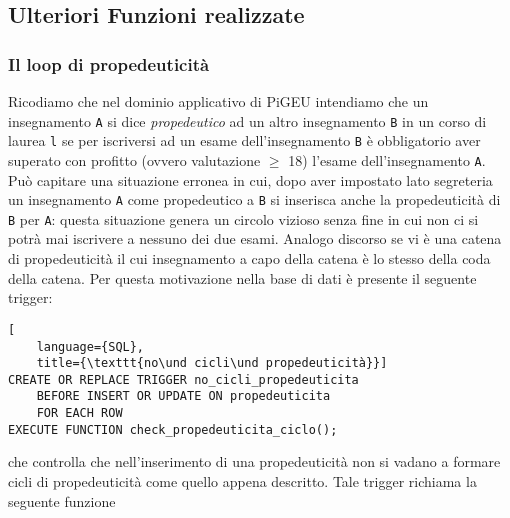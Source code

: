 \documentclass{article}
\newcommand{\und}[0]{\textunderscore}
\begin{document}
\subsection{Ulteriori Funzioni realizzate}
\subsubsection{Il loop di propedeuticità}
Ricodiamo che nel dominio applicativo di PiGEU intendiamo che un insegnamento \texttt{A} si dice \textit{propedeutico} ad un altro insegnamento \texttt{B} in un corso di laurea \texttt{l} se per iscriversi ad un esame dell'insegnamento \texttt{B} è obbligatorio aver superato con profitto (ovvero valutazione $\geq$ 18) l'esame dell'insegnamento \texttt{A}.
Può capitare una situazione erronea in cui, dopo aver impostato lato segreteria un insegnamento \texttt{A} come propedeutico a \texttt{B} si inserisca anche la propedeuticità di \texttt{B} per \texttt{A}: questa situazione genera un circolo vizioso senza fine in cui non ci si potrà mai iscrivere a nessuno dei due esami. Analogo discorso se vi è una catena di propedeuticità il cui insegnamento a capo della catena è lo stesso della coda della catena.
Per questa motivazione nella base di dati è presente il seguente trigger:
\begin{lstlisting}[
    language={SQL},
    title={\texttt{no\und cicli\und propedeuticità}}]
CREATE OR REPLACE TRIGGER no_cicli_propedeuticita
    BEFORE INSERT OR UPDATE ON propedeuticita
    FOR EACH ROW
EXECUTE FUNCTION check_propedeuticita_ciclo();
\end{lstlisting}

che controlla che nell'inserimento di una propedeuticità non si vadano a formare cicli di propedeuticità come quello appena descritto. Tale trigger richiama la seguente funzione
\end{document}
